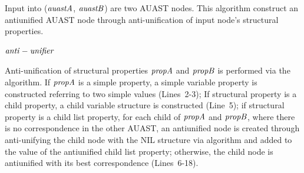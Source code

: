 \begin{algorithm}
 \caption{Input into ($\mathit{auastA}$, $\mathit{auastB}$) are two AUAST nodes. This algorithm construct an antiunified AUAST node through anti-unification of input node's structural properties.}
  \label{AntiUnify}
  \begin{algorithmic}[1]
\AntiUnify
{}
	\Else
	\EndIf
\EndFor
{}
	
	\EndIf	
\EndFor
\Return $\mathit{anti-unifier}$
\end{algorithmic}
\end{algorithm}

Anti-unification of structural properties $\mathit{propA}$ and $\mathit{propB}$ is performed via the  algorithm. If $\mathit{propA}$ is a simple property, a simple variable property is constructed referring to two simple values (Lines~2-3); If structural property is a child property, a child variable structure is constructed (Line~5); if structural property is a child list property, for each child of $\mathit{propA}$ and $\mathit{propB}$, where there is no correspondence in the other AUAST, an antiunified node is created through anti-unifying the child node with the NIL structure via  algorithm and added to the value of the antiunified child list property; otherwise, the child node is antiunified with its best correspondence (Lines~6-18).


